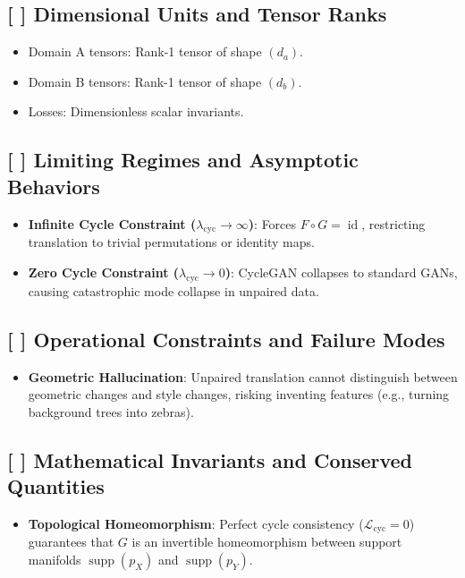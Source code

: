 \documentclass[11pt,a4paper]{article}
\theoremstyle{definition}
\begin{document}
\subsection{[ ] Dimensional Units and Tensor Ranks}
\begin{itemize}
    \item Domain A tensors: Rank-1 tensor of shape $(d_a)$.
    \item Domain B tensors: Rank-1 tensor of shape $(d_b)$.
    \item Losses: Dimensionless scalar invariants.
\end{itemize}

\subsection{[ ] Limiting Regimes and Asymptotic Behaviors}
\begin{itemize}
    \item \textbf{Infinite Cycle Constraint ($\lambda_{\text{cyc}} \to \infty$)}: Forces $F \circ G = \operatorname{id}$, restricting translation to trivial permutations or identity maps.
    \item \textbf{Zero Cycle Constraint ($\lambda_{\text{cyc}} \to 0$)}: CycleGAN collapses to standard GANs, causing catastrophic mode collapse in unpaired data.
\end{itemize}

\subsection{[ ] Operational Constraints and Failure Modes}
\begin{itemize}
    \item \textbf{Geometric Hallucination}: Unpaired translation cannot distinguish between geometric changes and style changes, risking inventing features (e.g., turning background trees into zebras).
\end{itemize}

\subsection{[ ] Mathematical Invariants and Conserved Quantities}
\begin{itemize}
    \item \textbf{Topological Homeomorphism}: Perfect cycle consistency ($\mathcal{L}_{\text{cyc}} = 0$) guarantees that $G$ is an invertible homeomorphism between support manifolds $\operatorname{supp}(p_X)$ and $\operatorname{supp}(p_Y)$.
\end{itemize}
\end{document}
